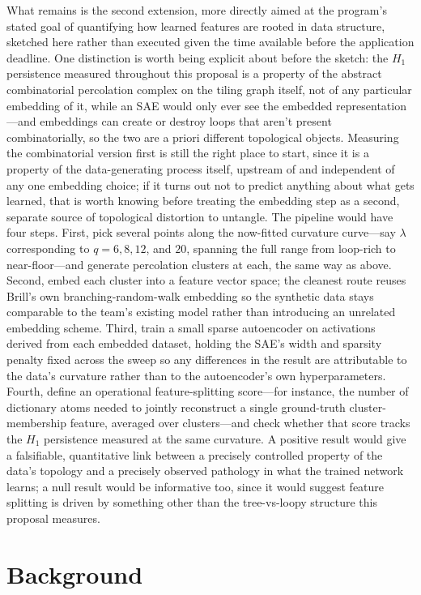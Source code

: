 \documentclass[11pt]{article}
\begin{document}
What remains is the second extension, more directly aimed at the program's stated goal of quantifying how learned features are rooted in data structure, sketched here rather than executed given the time available before the application deadline. One distinction is worth being explicit about before the sketch: the $H_1$ persistence measured throughout this proposal is a property of the abstract combinatorial percolation complex on the tiling graph itself, not of any particular embedding of it, while an SAE would only ever see the embedded representation---and embeddings can create or destroy loops that aren't present combinatorially, so the two are a priori different topological objects. Measuring the combinatorial version first is still the right place to start, since it is a property of the data-generating process itself, upstream of and independent of any one embedding choice; if it turns out not to predict anything about what gets learned, that is worth knowing before treating the embedding step as a second, separate source of topological distortion to untangle. The pipeline would have four steps. First, pick several points along the now-fitted curvature curve---say $\lambda$ corresponding to $q = 6, 8, 12$, and $20$, spanning the full range from loop-rich to near-floor---and generate percolation clusters at each, the same way as above. Second, embed each cluster into a feature vector space; the cleanest route reuses Brill's own branching-random-walk embedding so the synthetic data stays comparable to the team's existing model rather than introducing an unrelated embedding scheme. Third, train a small sparse autoencoder on activations derived from each embedded dataset, holding the SAE's width and sparsity penalty fixed across the sweep so any differences in the result are attributable to the data's curvature rather than to the autoencoder's own hyperparameters. Fourth, define an operational feature-splitting score---for instance, the number of dictionary atoms needed to jointly reconstruct a single ground-truth cluster-membership feature, averaged over clusters---and check whether that score tracks the $H_1$ persistence measured at the same curvature. A positive result would give a falsifiable, quantitative link between a precisely controlled property of the data's topology and a precisely observed pathology in what the trained network learns; a null result would be informative too, since it would suggest feature splitting is driven by something other than the tree-vs-loopy structure this proposal measures.

\section{Background}
\end{document}
